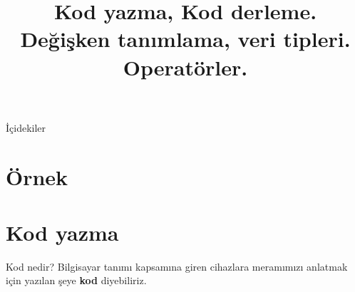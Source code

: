 
\title[Ders 1] {Kod yazma, Kod derleme. Değişken tanımlama, veri tipleri. Operatörler.}

\frame{\titlepage}
\begin{frame}[fragile]{İçidekiler}
    \tableofcontents
\end{frame}
\section{Örnek}
\begin{frame}[fragile]
    
\end{frame}
\section{Kod yazma}
\begin{frame}[fragile]{Kod nedir?}
    Bilgisayar tanımı kapsamına giren cihazlara meramımızı anlatmak için yazılan şeye \textbf{kod} diyebiliriz.
\end{frame}
